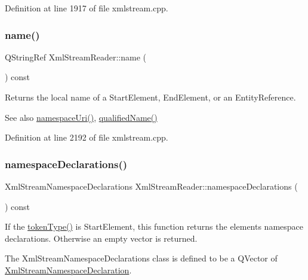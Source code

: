 Definition at line 1917 of file xmlstream.\+cpp.

\mbox{\label{class_xml_stream_reader_a09b44691e1e74daa6bdd4ed465d3c0a2}} 
\subsubsection{\texorpdfstring{name()}{name()}}
{\footnotesize\ttfamily Q\+String\+Ref Xml\+Stream\+Reader\+::name (\begin{DoxyParamCaption}{ }\end{DoxyParamCaption}) const}

Returns the local name of a Start\+Element, End\+Element, or an Entity\+Reference.

\begin{DoxySeeAlso}{See also}
\hyperlink{class_xml_stream_reader_a4ea3344f8632d1cd70edfaddf9a8027c}{namespace\+Uri()}, \hyperlink{class_xml_stream_reader_a1afff37e8245261beb5c31db56912b8c}{qualified\+Name()} 
\end{DoxySeeAlso}


Definition at line 2192 of file xmlstream.\+cpp.

\mbox{\label{class_xml_stream_reader_a3e6033d64f3744d90e96287f3a04d913}} 
\subsubsection{\texorpdfstring{namespace\+Declarations()}{namespaceDeclarations()}}
{\footnotesize\ttfamily Xml\+Stream\+Namespace\+Declarations Xml\+Stream\+Reader\+::namespace\+Declarations (\begin{DoxyParamCaption}{ }\end{DoxyParamCaption}) const}

If the \hyperlink{class_xml_stream_reader_a2c26bfb63c27f2992e24f038d65c8c0a}{token\+Type()} is  Start\+Element, this function returns the element\textquotesingle{}s namespace declarations. Otherwise an empty vector is returned.

The Xml\+Stream\+Namespace\+Declarations class is defined to be a Q\+Vector of \hyperlink{class_xml_stream_namespace_declaration}{Xml\+Stream\+Namespace\+Declaration}.

